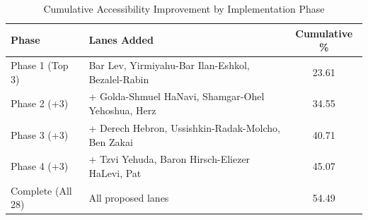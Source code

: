 \begin{table}[H]
\centering
\caption{Cumulative Accessibility Improvement by Implementation Phase}
\label{tab:phases}
\begin{tabular}{@{}llc@{}}
\toprule
\textbf{Phase} & \textbf{Lanes Added} & \textbf{Cumulative \%} \\
\midrule
Phase 1 (Top 3) & Bar Lev, Yirmiyahu-Bar Ilan-Eshkol, Bezalel-Rabin & 23.61 \\
Phase 2 (+3) & + Golda-Shmuel HaNavi, Shamgar-Ohel Yehoshua, Herz & 34.55 \\
Phase 3 (+3) & + Derech Hebron, Ussishkin-Radak-Molcho, Ben Zakai & 40.71 \\
Phase 4 (+3) & + Tzvi Yehuda, Baron Hirsch-Eliezer HaLevi, Pat & 45.07 \\
Complete (All 28) & All proposed lanes & 54.49 \\
\bottomrule
\end{tabular}
\end{table}

